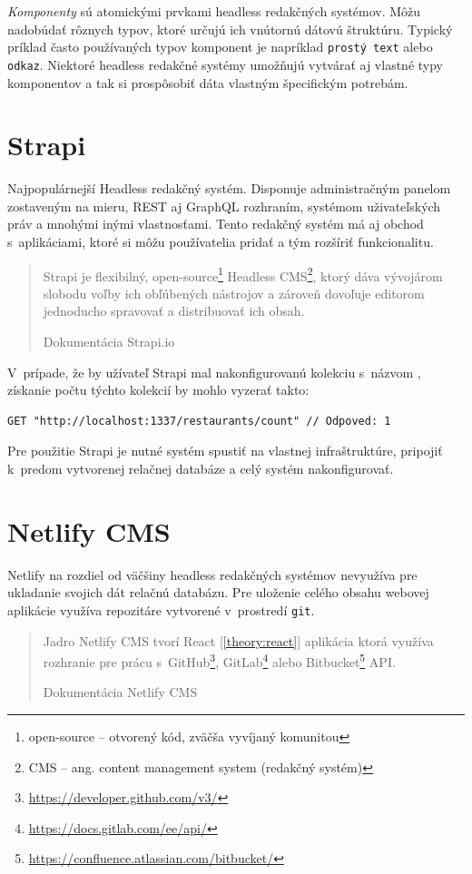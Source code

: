 \noindent \emph{Komponenty} sú atomickými prvkami headless redakčných systémov. Môžu nadobúdať rôznych typov, ktoré určujú ich vnútornú dátovú štruktúru. Typický príklad často používaných typov komponent je napríklad \texttt{prostý text} alebo \texttt{odkaz}. Niektoré headless redakčné systémy umožňujú vytvárať aj vlastné typy komponentov a tak si prospôsobiť dáta vlastným špecifickým potrebám.

\section{Strapi}
Najpopulárnejší Headless redakčný systém. Disponuje administračným panelom zostaveným na mieru, REST aj GraphQL rozhraním, systémom uživateľských práv a mnohými inými vlastnosťami. Tento redakčný systém má aj obchod s~aplikáciami, ktoré si môžu používatelia pridať a tým rozšíriť funkcionalitu. 

\blockquote[Dokumentácia Strapi.io \cite{StrapiDocs}]{Strapi je flexibilný, open-source\footnote{open-source -- otvorený kód, zväčša vyvíjaný komunitou} Headless CMS\footnote{CMS -- ang. content management system (redakčný systém)}, ktorý dáva vývojárom slobodu voľby ich obľúbených nástrojov a zároveň dovoľuje editorom jednoducho spravovať a distribuovať ich obsah.}

\noindent V~prípade, že by užívateľ Strapi mal nakonfigurovanú kolekciu s~názvom , získanie počtu týchto kolekcií by mohlo vyzerať takto: \\

\begin{lstlisting}[caption=Príklad HTTP požiadavku na REST rozhranie Strapi.]
	GET "http://localhost:1337/restaurants/count" // Odpoved: 1
\end{lstlisting}

\bigskip

\noindent Pre použitie Strapi je nutné systém spustiť na vlastnej infraštruktúre, pripojiť k~predom vytvorenej relačnej databáze a celý systém nakonfigurovať.

\section{Netlify CMS}
Netlify na rozdiel od väčšiny headless redakčných systémov nevyužíva pre ukladanie svojich dát relačnú databázu. Pre uloženie celého obsahu webovej aplikácie využíva repozitáre vytvorené v~prostredí \texttt{git}.

\blockquote[Dokumentácia Netlify CMS \cite{NetlifyDocs}]{Jadro Netlify CMS tvorí React [\ref{theory:react}] aplikácia ktorá využíva rozhranie pre prácu s~GitHub\footnote{\href{https://developer.github.com/v3/}{https://developer.github.com/v3/}}, GitLab\footnote{\href{https://docs.gitlab.com/ee/api/}{https://docs.gitlab.com/ee/api/}} alebo Bitbucket\footnote{\href{https://confluence.atlassian.com/bitbucket/}{https://confluence.atlassian.com/bitbucket/}} API.}

